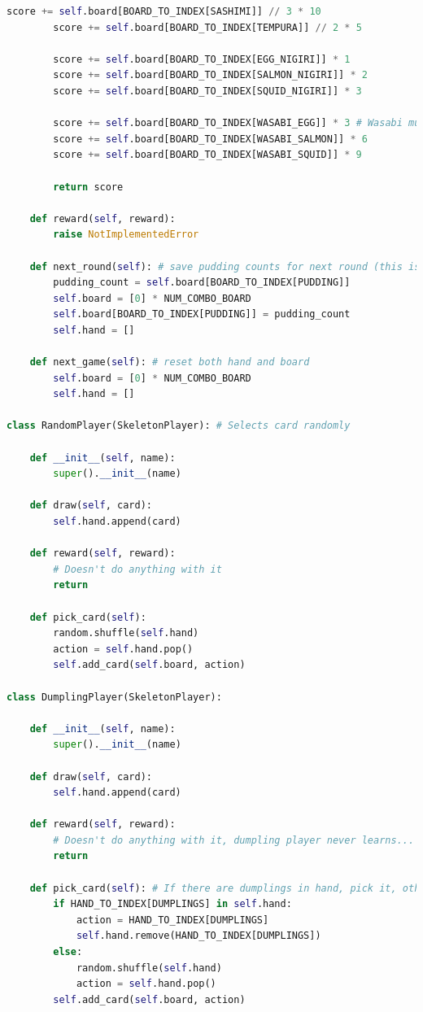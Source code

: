\begin{lstlisting}[language=Python]
        score += self.board[BOARD_TO_INDEX[SASHIMI]] // 3 * 10
        score += self.board[BOARD_TO_INDEX[TEMPURA]] // 2 * 5  
        
        score += self.board[BOARD_TO_INDEX[EGG_NIGIRI]] * 1   
        score += self.board[BOARD_TO_INDEX[SALMON_NIGIRI]] * 2 
        score += self.board[BOARD_TO_INDEX[SQUID_NIGIRI]] * 3  
        
        score += self.board[BOARD_TO_INDEX[WASABI_EGG]] * 3 # Wasabi multiplies nigiri score by 3
        score += self.board[BOARD_TO_INDEX[WASABI_SALMON]] * 6  
        score += self.board[BOARD_TO_INDEX[WASABI_SQUID]] * 9  

        return score

    def reward(self, reward):
        raise NotImplementedError

    def next_round(self): # save pudding counts for next round (this is since pudding doesn't get scored until end of game)
        pudding_count = self.board[BOARD_TO_INDEX[PUDDING]]
        self.board = [0] * NUM_COMBO_BOARD
        self.board[BOARD_TO_INDEX[PUDDING]] = pudding_count
        self.hand = []

    def next_game(self): # reset both hand and board
        self.board = [0] * NUM_COMBO_BOARD
        self.hand = []

class RandomPlayer(SkeletonPlayer): # Selects card randomly

    def __init__(self, name):
        super().__init__(name)

    def draw(self, card):
        self.hand.append(card)
    
    def reward(self, reward):
        # Doesn't do anything with it
        return

    def pick_card(self):
        random.shuffle(self.hand)
        action = self.hand.pop()
        self.add_card(self.board, action)

class DumplingPlayer(SkeletonPlayer):

    def __init__(self, name):
        super().__init__(name)

    def draw(self, card):
        self.hand.append(card)
    
    def reward(self, reward):
        # Doesn't do anything with it, dumpling player never learns...
        return

    def pick_card(self): # If there are dumplings in hand, pick it, otherwise pick randomly
        if HAND_TO_INDEX[DUMPLINGS] in self.hand:
            action = HAND_TO_INDEX[DUMPLINGS]
            self.hand.remove(HAND_TO_INDEX[DUMPLINGS])
        else:
            random.shuffle(self.hand)
            action = self.hand.pop()
        self.add_card(self.board, action)


\end{lstlisting}
